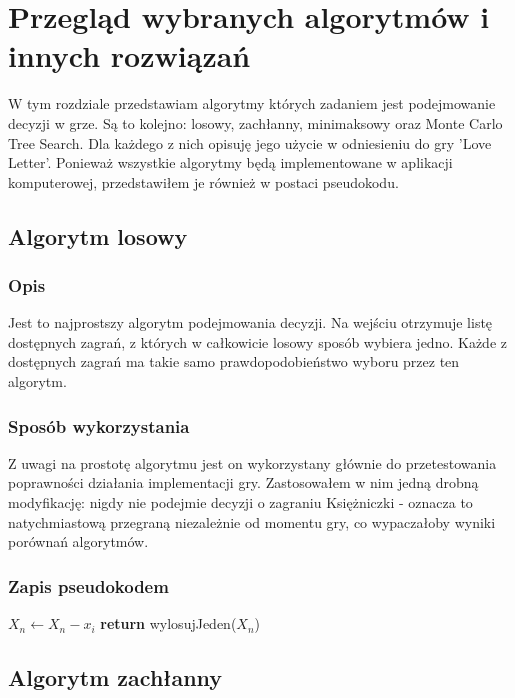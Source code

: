 \chapter{Przegląd wybranych algorytmów i innych rozwiązań}
\label{cha:rozdz3}

W tym rozdziale przedstawiam algorytmy których zadaniem jest podejmowanie decyzji w grze. Są to kolejno: losowy, zachłanny, minimaksowy oraz Monte Carlo Tree Search. Dla każdego z nich opisuję jego użycie w odniesieniu do gry 'Love Letter'. Ponieważ wszystkie algorytmy będą implementowane w aplikacji komputerowej, przedstawiłem je również w postaci pseudokodu.

\section{Algorytm losowy}
\label{sec:algLos}
\subsection{Opis}
Jest to najprostszy algorytm podejmowania decyzji. Na wejściu otrzymuje listę dostępnych zagrań, z których w całkowicie losowy sposób wybiera jedno. Każde z dostępnych zagrań ma takie samo prawdopodobieństwo wyboru przez ten algorytm.

\subsection{Sposób wykorzystania}
Z uwagi na prostotę algorytmu jest on wykorzystany głównie do przetestowania poprawności działania implementacji gry. Zastosowałem w nim jedną drobną modyfikację: nigdy nie podejmie decyzji o zagraniu Księżniczki - oznacza to natychmiastową przegraną niezależnie od momentu gry, co wypaczałoby wyniki porównań algorytmów.

\subsection{Zapis pseudokodem}
\begin{algorithmic}[1]
				\State $X_n \gets X_n - x_i$
			\EndIf
		\EndFor
	\State \textbf{return} wylosujJeden($X_n$) 
	\EndFunction
\end{algorithmic}

\section{Algorytm zachłanny}
\label{sec:algZach}

